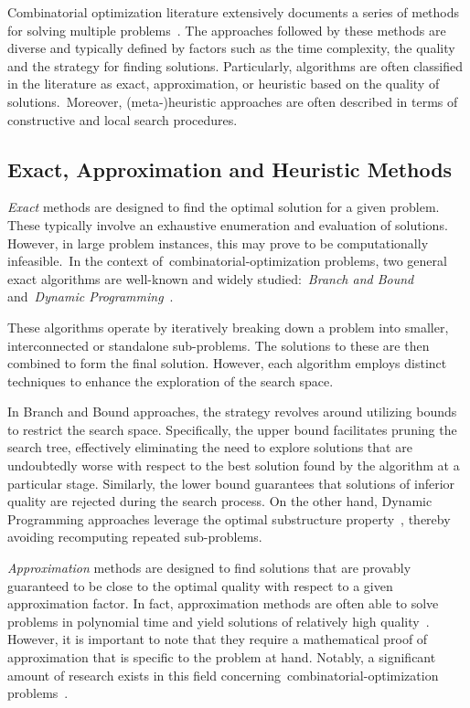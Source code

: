 Combinatorial optimization literature extensively documents a series of methods
for solving multiple
problems~\cite{papadimitriou1998combinatorial,yu2010combinatorial,luke2013essentialsa}.
The approaches followed by these methods are diverse and typically defined by
factors such as the time complexity, the quality and the strategy for finding
solutions. Particularly, algorithms are often classified in the literature as
exact, approximation, or heuristic based on the quality of solutions.~Moreover,
(meta-)heuristic approaches are often described in terms of constructive and
local search procedures.

\subsection{Exact, Approximation and Heuristic Methods}
\label{subsec:approaches}

\emph{Exact} methods are designed to find the optimal solution for a given
problem. These typically involve an exhaustive enumeration and evaluation of
solutions. However, in large problem instances, this may prove to be
computationally infeasible.~In the context
of~\acrshort{combinatorial-optimization} problems, two general exact algorithms
are well-known and widely studied:~\textit{Branch and Bound} and~\textit{Dynamic
  Programming}~\cite{clausen1999branch,festa2014brief}.

These algorithms operate by iteratively breaking down a problem into smaller,
interconnected or standalone sub-problems. The solutions to these are then
combined to form the final solution. However, each algorithm employs distinct
techniques to enhance the exploration of the search space.

In Branch and Bound approaches, the strategy revolves around utilizing bounds to
restrict the search space. Specifically, the upper bound facilitates pruning the
search tree, effectively eliminating the need to explore solutions that are
undoubtedly worse with respect to the best solution found by the algorithm at a
particular stage. Similarly, the lower bound guarantees that solutions of
inferior quality are rejected during the search process. On the other hand,
Dynamic Programming approaches leverage the optimal substructure
property~\cite{festa2014brief}, thereby avoiding recomputing repeated
sub-problems.

\emph{Approximation} methods are designed to find solutions that are provably
guaranteed to be close to the optimal quality with respect to a given
approximation factor. In fact, approximation methods are often able to solve
problems in polynomial time and yield solutions of relatively high
quality~\cite{williamson2011design}.  However, it is important to note that
they require a mathematical proof of approximation that is specific to the
problem at hand. Notably, a significant amount of research exists in this field
concerning~\acrshort{combinatorial-optimization}
problems~\cite{johnson1974approximation}.

